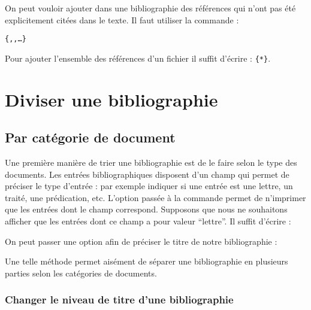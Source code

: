 On peut vouloir ajouter dans une bibliographie des références qui n'ont pas été explicitement citées dans le texte. Il faut  utiliser la commande :

\verb|{|\verb|,|\verb|,…}|

Pour ajouter l'ensemble des références d'un fichier  il suffit d'écrire : \verb|{*}|.

\section{Diviser une bibliographie}

\subsection{Par catégorie de document}
Une première manière de trier une bibliographie est de le faire selon le type des documents. Les entrées bibliographiques disposent d'un champ  qui permet de préciser le type d'entrée : par exemple indiquer si une entrée est une lettre, un traité, une prédication, etc. L'option  passée à la commande  permet de n'imprimer que les entrées dont le champ  correspond. Supposons que nous ne souhaitons afficher que les entrées dont ce champ  a pour valeur \enquote{lettre}. Il suffit d'écrire :

\begin{latexcode}
\printbibliography[subtype=lettre]
\end{latexcode}

On peut passer une option  afin de préciser le titre de notre bibliographie :

\begin{latexcode}
\printbibliography[subtype=lettre,title=Lettres]
\end{latexcode}

Une telle méthode permet aisément de séparer une bibliographie en plusieurs parties selon les catégories de documents.

\begin{latexcode}
\printbibliography[subtype=concile,title=Actes de concile]
\printbibliography[subtype=traite,title=Traités]
\printbibliography[subtype=lettre,title=Lettres]
\end{latexcode}


\subsubsection{Changer le niveau de titre d'une bibliographie}

